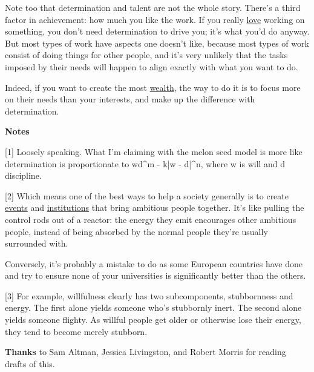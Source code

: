 Note too that determination and talent are not
                    the whole story. There's a third factor in achievement: how
                    much you like the work. If you really
                    \href{http://www.paulgraham.com/love.html}{love} working on something, you don't
                    need determination to drive you; it's what you'd do anyway.
                    But most types of work have aspects one doesn't like,
                    because most types of work consist of doing things for other
                    people, and it's very unlikely that the tasks imposed by
                    their needs will happen to align exactly with what you want
                    to do.

Indeed, if you want to create the most
                    \href{http://www.paulgraham.com/wealth.html}{wealth}, the way to do it is to
                    focus more on their needs than your interests, and make up
                    the difference with determination.







\textbf{Notes}

[1] Loosely speaking. What I'm claiming with the melon seed
                    model is more like determination is proportionate to wd\textasciicircum{}m -
                    k|w - d|\textasciicircum{}n, where w is will and d discipline.

[2] Which means one of the best ways to help a society
                    generally is to create
                    \href{http://startupschool.org}{events} and
                    \href{http://ycombinator.com}{institutions} that bring
                    ambitious people together. It's like pulling the control
                    rods out of a reactor: the energy they emit encourages other
                    ambitious people, instead of being absorbed by the normal
                    people they're usually surrounded with.

Conversely,
                    it's probably a mistake to do as some European countries
                    have done and try to ensure none of your universities is
                    significantly better than the others.

[3] For example, willfulness clearly has two subcomponents,
                    stubbornness and energy. The first alone yields someone
                    who's stubbornly inert. The second alone yields someone
                    flighty. As willful people get older or otherwise lose their
                    energy, they tend to become merely stubborn.


                    \textbf{Thanks} to Sam Altman, Jessica Livingston, and Robert
                    Morris for reading drafts of this.



              
            
          
